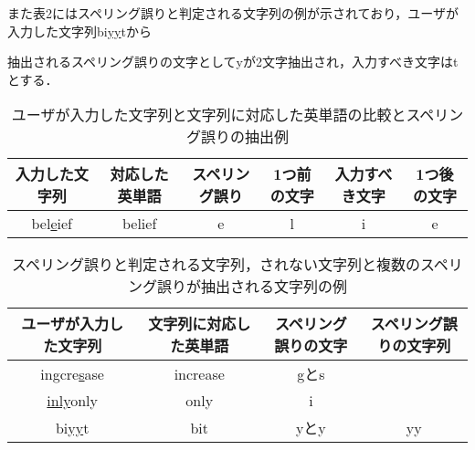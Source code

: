 \begin{comment}
タイピングゲームにおいてスペリング誤りだと判定される文字が連続で入力され，それらの文字の連続が全てスペリング誤りだと判定された場合，それらの文字の連続は文字列として分析を行う．
\end{comment}
また表2にはスペリング誤りと判定される文字列の例が示されており，ユーザが入力した文字列bi\underline{yy}tから
\begin{comment}
抽出されるスペリング誤りの文字列としてyyを分析する．
このような編集距離が2以上の文字列に関してのスペリング誤りの確認は目視で行った．
抽出した文字列に含まれる文字は文字単位のスペリング誤りとして扱うことができるので，1文字ずつに分けて文字としても分析を行うものとし，表2のユーザが入力した文字列がbi\underline{yy}tの場合では，
\end{comment}
抽出されるスペリング誤りの文字としてyが2文字抽出され，入力すべき文字はtとする．

  \begin{table*}[t]
  \small
   \caption{ユーザが入力した文字列と文字列に対応した英単語の比較とスペリング誤りの抽出例}
   \begin{tabular}{|c|c|c|c|c|c|} \hline
       	入力した文字列 & 対応した英単語 & スペリング誤り & 1つ前の文字 & 入力すべき文字 & 1つ後の文字\\ \hline
	    bel\underline{e}ief & belief & e & l & i & e\\ \hline
   \end{tabular}
 \end{table*}

 \begin{table*}[t]
  \small
  \begin{center}
   \caption{スペリング誤りと判定される文字列，されない文字列と複数のスペリング誤りが抽出される文字列の例}
   \begin{tabular}{|c|c|c|c|} \hline
       	ユーザが入力した文字列 & 文字列に対応した英単語 & スペリング誤りの文字 & スペリング誤りの文字列\\ \hline
		in\underline{g}cre\underline{s}ase & increase & gとs & \\ \hline
		\underline{inly}only & only & i & \\ \hline
	    bi\underline{yy}t & bit & yとy & yy\\ \hline
   \end{tabular}
  \end{center}
 \end{table*}

